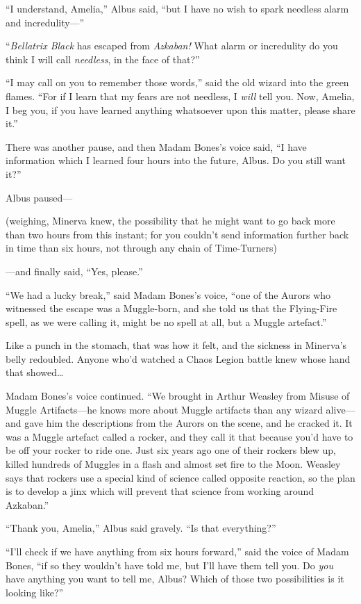 “I understand, Amelia,” Albus said, “but I have no wish to spark needless alarm and incredulity—”

“\emph{Bellatrix Black} has escaped from \emph{Azkaban!} What alarm or incredulity do you think I will call \emph{needless}, in the face of that?”

“I may call on you to remember those words,” said the old wizard into the green flames. “For if I learn that my fears are not needless, I \emph{will} tell you. Now, Amelia, I beg you, if you have learned anything whatsoever upon this matter, please share it.”

There was another pause, and then Madam Bones’s voice said, “I have information which I learned four hours into the future, Albus. Do you still want it?”

Albus paused—

(weighing, Minerva knew, the possibility that he might want to go back more than two hours from this instant; for you couldn’t send information further back in time than six hours, not through any chain of Time-Turners)

—and finally said, “Yes, please.”

“We had a lucky break,” said Madam Bones’s voice, “one of the Aurors who witnessed the escape was a Muggle-born, and she told us that the Flying-Fire spell, as we were calling it, might be no spell at all, but a Muggle artefact.”

Like a punch in the stomach, that was how it felt, and the sickness in Minerva’s belly redoubled. Anyone who’d watched a Chaos Legion battle knew whose hand that showed…

Madam Bones’s voice continued. “We brought in Arthur Weasley from Misuse of Muggle Artifacts—he knows more about Muggle artifacts than any wizard alive—and gave him the descriptions from the Aurors on the scene, and he cracked it. It was a Muggle artefact called a rocker, and they call it that because you’d have to be off your rocker to ride one. Just six years ago one of their rockers blew up, killed hundreds of Muggles in a flash and almost set fire to the Moon. Weasley says that rockers use a special kind of science called opposite reaction, so the plan is to develop a jinx which will prevent that science from working around Azkaban.”

“Thank you, Amelia,” Albus said gravely. “Is that everything?”

“I’ll check if we have anything from six hours forward,” said the voice of Madam Bones, “if so they wouldn’t have told me, but I’ll have them tell you. Do \emph{you} have anything you want to tell me, Albus? Which of those two possibilities is it looking like?”

